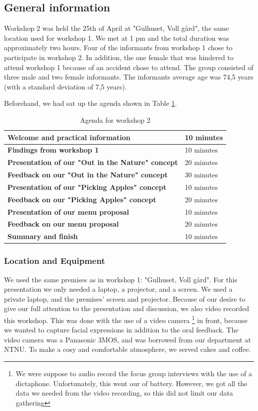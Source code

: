 \subsection{General information}
Workshop 2 was held the 25th of April at "Gulhuset, Voll gård", the same location used for workshop 1. We met at 1 pm and the total duration was approximately two hours. Four of the informants from workshop 1 chose to participate in workshop 2. In addition, the one female that was hindered to attend workshop 1 because of an accident chose to attend. The group consisted of three male and two female informants. The informants average age was 74,5 years (with a standard deviation of 7,5 years).  

Beforehand, we had sat up the agenda shown in Table \ref{tab:agendaW2}. 


\begin{table} [ht!]
\centering
    \begin{tabular}{|l|l|}
       \hline
       \textbf{Welcome and practical information} & 10 minutes  \\ \hline
       \textbf{Findings from workshop 1} & 10 minutes \\ \hline
       \textbf{Presentation of our "Out in the Nature" concept} & 20 minutes \\ \hline
	   \textbf{Feedback on our "Out in the Nature" concept} & 30 minutes \\ \hline
	   \textbf{Presentation of our "Picking Apples" concept} & 10 minutes \\ \hline
	   \textbf{Feedback on our "Picking Apples" concept} & 20 minutes \\ \hline
	   \textbf{Presentation of our menu proposal} & 10 minutes \\ \hline
	   \textbf{Feedback on our menu proposal} & 20 minutes \\ \hline
	   \textbf{Summary and finish} & 10 minutes \\ \hline
    \end{tabular}
    \caption[Workshop 2 agenda]{Agenda for workshop 2}
    \label{tab:agendaW2}
\end{table} 


\subsubsection{Location and Equipment}
We used the same premises as in workshop 1: "Gulhuset, Voll gård". 
For this presentation we only needed a laptop, a projector, and a screen. We used a private laptop, and the premises' screen and projector. Because of our desire to give our full attention to the presentation and discussion, we also video recorded this workshop. This was done with the use of a video camera \footnote{We were suppose to audio record the focus group interviews with the use of a dictaphone. Unfortunately, this went our of battery. However, we got all the data we needed from the video recording, so this did not limit our data gathering} in front, because we wanted to capture facial expressions in addition to the oral feedback. The video camera was a Panasonic 3MOS, and was borrowed from our department at NTNU. To make a cosy and comfortable atmosphere, we served cakes and coffee.   

